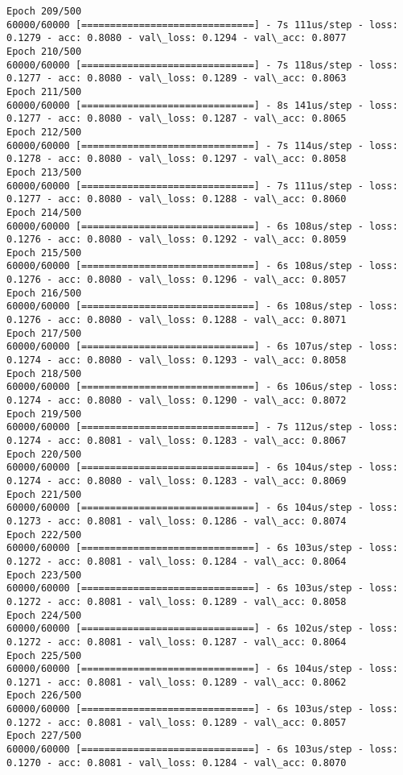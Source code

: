 \documentclass[11pt]{article}
\begin{document}
\begin{Verbatim}[commandchars=\\\{\}]
Epoch 209/500
60000/60000 [==============================] - 7s 111us/step - loss: 0.1279 - acc: 0.8080 - val\_loss: 0.1294 - val\_acc: 0.8077
Epoch 210/500
60000/60000 [==============================] - 7s 118us/step - loss: 0.1277 - acc: 0.8080 - val\_loss: 0.1289 - val\_acc: 0.8063
Epoch 211/500
60000/60000 [==============================] - 8s 141us/step - loss: 0.1277 - acc: 0.8080 - val\_loss: 0.1287 - val\_acc: 0.8065
Epoch 212/500
60000/60000 [==============================] - 7s 114us/step - loss: 0.1278 - acc: 0.8080 - val\_loss: 0.1297 - val\_acc: 0.8058
Epoch 213/500
60000/60000 [==============================] - 7s 111us/step - loss: 0.1277 - acc: 0.8080 - val\_loss: 0.1288 - val\_acc: 0.8060
Epoch 214/500
60000/60000 [==============================] - 6s 108us/step - loss: 0.1276 - acc: 0.8080 - val\_loss: 0.1292 - val\_acc: 0.8059
Epoch 215/500
60000/60000 [==============================] - 6s 108us/step - loss: 0.1276 - acc: 0.8080 - val\_loss: 0.1296 - val\_acc: 0.8057
Epoch 216/500
60000/60000 [==============================] - 6s 108us/step - loss: 0.1276 - acc: 0.8080 - val\_loss: 0.1288 - val\_acc: 0.8071
Epoch 217/500
60000/60000 [==============================] - 6s 107us/step - loss: 0.1274 - acc: 0.8080 - val\_loss: 0.1293 - val\_acc: 0.8058
Epoch 218/500
60000/60000 [==============================] - 6s 106us/step - loss: 0.1274 - acc: 0.8080 - val\_loss: 0.1290 - val\_acc: 0.8072
Epoch 219/500
60000/60000 [==============================] - 7s 112us/step - loss: 0.1274 - acc: 0.8081 - val\_loss: 0.1283 - val\_acc: 0.8067
Epoch 220/500
60000/60000 [==============================] - 6s 104us/step - loss: 0.1274 - acc: 0.8080 - val\_loss: 0.1283 - val\_acc: 0.8069
Epoch 221/500
60000/60000 [==============================] - 6s 104us/step - loss: 0.1273 - acc: 0.8081 - val\_loss: 0.1286 - val\_acc: 0.8074
Epoch 222/500
60000/60000 [==============================] - 6s 103us/step - loss: 0.1272 - acc: 0.8081 - val\_loss: 0.1284 - val\_acc: 0.8064
Epoch 223/500
60000/60000 [==============================] - 6s 103us/step - loss: 0.1272 - acc: 0.8081 - val\_loss: 0.1289 - val\_acc: 0.8058
Epoch 224/500
60000/60000 [==============================] - 6s 102us/step - loss: 0.1272 - acc: 0.8081 - val\_loss: 0.1287 - val\_acc: 0.8064
Epoch 225/500
60000/60000 [==============================] - 6s 104us/step - loss: 0.1271 - acc: 0.8081 - val\_loss: 0.1289 - val\_acc: 0.8062
Epoch 226/500
60000/60000 [==============================] - 6s 103us/step - loss: 0.1272 - acc: 0.8081 - val\_loss: 0.1289 - val\_acc: 0.8057
Epoch 227/500
60000/60000 [==============================] - 6s 103us/step - loss: 0.1270 - acc: 0.8081 - val\_loss: 0.1284 - val\_acc: 0.8070

\end{Verbatim}
\end{document}
